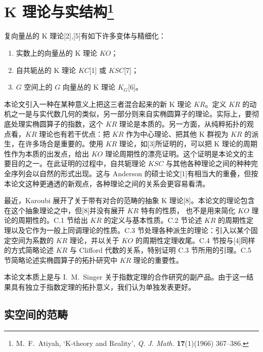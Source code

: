 \chapter[K 理论与实结构]{K 理论与实结构\protect\footnote{M.~F.~Atiyah, `K-theory and Reality', \textit{Q. J. Math.} \textbf{17}(1)(1966) 367--386.}}


复向量丛的 K 理论[2],[5]有如下许多变体与精细化：

\begin{enumerate}[label=(\arabic*),leftmargin=2.2em,itemsep=2pt]
\item 实数上的向量丛的 K 理论 $KO$；
\item 自共轭丛的 K 理论 $KC$[1] 或 $KSC$[7]；
\item $G$ 空间上的 $G$ 向量丛的 K 理论 $K_G$[6]。
\end{enumerate}

本论文引入一种在某种意义上把这三者混合起来的新 K 理论 $KR$。定义 $KR$ 的动机之一是与实代数几何的类似，另一部分则来自实椭圆算子的理论。实际上，要彻底处理实椭圆算子的指数，这个 $KR$ 理论是本质的。另一方面，从纯粹拓扑的观点看，$KR$ 理论也有若干优点：把 $KR$ 作为中心理论、把其他 K 群视为 $KR$ 的派生，在许多场合是重要的。使用 $KR$ 理论，如[3]所证明的，可以把 K 理论的周期性作为本质的出发点，给出 $KO$ 理论周期性的漂亮证明。这个证明是本论文的主要目的之一。在此证明的过程中，自共轭理论 $KSC$ 与其他各种理论之间的种种完全序列会以自然的形式出现。这与 Anderson 的硕士论文[1]有相当大的重叠，但按本论文这种更通透的新观点，各种理论之间的关系会更容易看清。

最近，Karoubi 展开了关于带有对合的范畴的抽象 K 理论[8]。本论文的理论包含在这个抽象理论之中，但[8]并没有展开 $KR$ 特有的性质，
也不是用来简化 $KO$ 理论的周期性的。C.1 节给出 $KR$ 的定义与基本性质。C.2 节论述 $KR$ 的周期性定理以及它作为一般上同调理论的性质。C.3 节处理各种派生的理论：引入以某个固定空间为系数的 $KR$ 理论，并以关于 $KO$ 的周期性定理收尾。C.4 节按与[4]同样的方式简略论述 $KR$ 与 Clifford 代数的关系，特别证明 C.3 节所用的引理。C.5 节简略论述实椭圆算子的拓扑研究中 $KR$ 理论的重要性。

本论文本质上是与 I.~M.~Singer 关于指数定理的合作研究的副产品。由于这一结果具有独立于指数定理的拓扑意义，我们认为单独发表更好。

\section{实空间的范畴}

